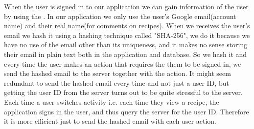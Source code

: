 When the user is signed in to our application we can gain information of the user by using the .
In our application we only use the user's Google email(account name) and their real name(for comments on recipes). 
When we receives the user's email we hash it using a hashing technique called "SHA-256", we do it because we have no use of the email other than its uniqueness, and it makes no sense storing their email in plain text both in the application and database. 
So we hash it and every time the user makes an action that requires the them to be signed in, we send the hashed email to the server together with the action. 
It might seem redundant to send the hashed email every time and not just a user ID, but getting the user ID from the server turns out to be quite stressful to the server. Each time a user switches activity i.e. each time they view a recipe, the application signs in the user, and thus query the server for the user ID. Therefore it is more efficient just to send the hashed email with each user action.



